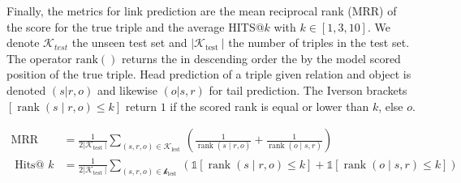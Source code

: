 Finally, the metrics for link prediction are the mean reciprocal rank (MRR) of the score for the true triple and the average HITS@$k$ with $k \in [1,3,10]$. We denote $\mathcal{K}_{test}$ the unseen test set and $\left|\mathcal{K}_{\text {test }}\right|$ the number of triples in the test set. The operator $\operatorname{rank()}$ returns the in descending order the by the model scored position of the true triple. Head prediction of a triple given relation and object is denoted $(s|r,o)$ and likewise $(o|s,r)$ for tail prediction. The Iverson brackets $[\operatorname{rank}(s \mid r, o) \leq k]$ return $1$ if the scored rank is equal or lower than $k$, else $o$. 


\begin{equation}
    \begin{aligned}
    \operatorname{MRR} &=\frac{1}{2\left|\mathcal{K}_{\text {test }}\right|} \sum_{(s, r, o) \in \mathcal{K}_{\text {lest }}}\left(\frac{1}{\operatorname{rank}(s \mid r, o)}+\frac{1}{\operatorname{rank}(o \mid s, r)}\right) \\
    \text { Hits@ } k &=\frac{1}{2\left|\mathcal{K}_{\text {test }}\right|} \sum_{(s, r, o) \in \mathcal{k}_{\text {lest }}}(\mathbb{1}[\operatorname{rank}(s \mid r, o) \leq k]+\mathbb{1}[\operatorname{rank}(o \mid s, r) \leq k])
    \end{aligned}
\label{eq4:MRR}
\end{equation}







